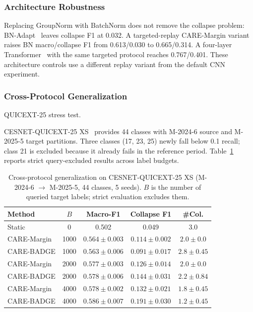 \documentclass[journal]{IEEEtran}
\newcommand{\ours}{CARE}  %
\begin{document}
\subsubsection{Architecture Robustness}
\label{sec:robustness}
\label{sec:bn_verify}
\label{sec:transformer}
Replacing GroupNorm with BatchNorm does not remove the collapse problem: BN-Adapt~\cite{schneider2020bn} leaves collapse F1 at 0.032. A targeted-replay CARE-Margin variant raises BN macro/collapse F1 from 0.613/0.030 to 0.665/0.314. A four-layer Transformer~\cite{vaswani2017attention} with the same targeted protocol reaches 0.767/0.401. These architecture controls use a different replay variant from the default CNN experiment.

\subsubsection{Cross-Protocol Generalization}
\label{sec:cross_protocol}

QUICEXT-25 stress test.
\label{sec:quicext25}

CESNET-QUICEXT-25 XS~\cite{cesnetquicext25,mucke2025waiting} provides 44 classes with M-2024-6 source and M-2025-5 target partitions. Three classes (17, 23, 25) newly fall below 0.1 recall; class 21 is excluded because it already fails in the reference period. Table~\ref{tab:quicext25} reports strict query-excluded results across label budgets.

\begin{table}[!htbp]
\centering
\caption{Cross-protocol generalization on CESNET-QUICEXT-25 XS (M-2024-6 $\to$ M-2025-5, 44 classes, 5 seeds). $B$ is the number of queried target labels; strict evaluation excludes them.}
\label{tab:quicext25}
\scriptsize
\setlength{\tabcolsep}{3pt}
\begin{tabular}{@{}l c c c c@{}}
\toprule
Method & $B$ & Macro-F1 & Collapse F1 & \#Col. \\
\midrule
Static & 0 & 0.502 & 0.049 & 3.0 \\
\ours{}-Margin & 1000 & $0.564{\pm}0.003$ & $0.114{\pm}0.002$ & $2.0{\pm}0.0$ \\
\ours{}-BADGE & 1000 & $0.563{\pm}0.006$ & $0.091{\pm}0.017$ & $2.8{\pm}0.45$ \\
\ours{}-Margin & 2000 & $0.577{\pm}0.003$ & $0.126{\pm}0.014$ & $2.0{\pm}0.0$ \\
\ours{}-BADGE & 2000 & $0.578{\pm}0.006$ & $0.144{\pm}0.031$ & $2.2{\pm}0.84$ \\
\ours{}-Margin & 4000 & $0.578{\pm}0.002$ & $0.132{\pm}0.021$ & $1.8{\pm}0.45$ \\
\ours{}-BADGE & 4000 & $\mathbf{0.586{\pm}0.007}$ & $\mathbf{0.191{\pm}0.030}$ & $\mathbf{1.2{\pm}0.45}$ \\
\bottomrule
\end{tabular}
\end{table}
\end{document}
